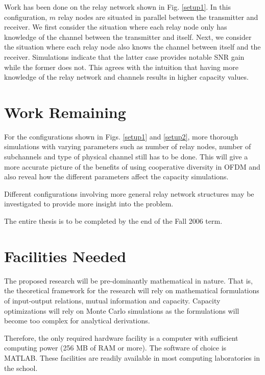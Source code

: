 \documentclass[12]{article}
\begin{document}
Work has been done on the relay network shown in Fig. \ref{setup1}.  In this configuration, $m$ relay nodes are situated in parallel between the transmitter and receiver.  We first consider the situation where each relay node only has knowledge of the channel between the transmitter and itself.  Next, we consider the situation where each relay node also knows the channel between itself and the receiver.  Simulations indicate that the latter case provides notable SNR gain while the former does not.  This agrees with the intuition that having more knowledge of the relay network and channels results in higher capacity values.
\section{Work Remaining}
For the configurations shown in Figs. \ref{setup1} and \ref{setup2}, more thorough simulations with varying parameters such as number of relay nodes, number of subchannels and type of physical channel still has to be done.  This will give a more accurate picture of the benefits of using cooperative diversity in OFDM and also reveal how the different parameters affect the capacity simulations.

Different configurations involving more general relay network structures may be investigated to provide more insight into the problem.

The entire thesis is to be completed by the end of the Fall 2006 term.
\section{Facilities Needed}
The proposed research will be pre-dominantly mathematical in nature.  That is, the theoretical framework for the research will rely on mathematical formulations of input-output relations, mutual information and capacity.  Capacity optimizations will rely on Monte Carlo simulations as the formulations will become too complex for analytical derivations.

Therefore, the only required hardware facility is a computer with sufficient computing power (256 MB of RAM or more).  The software of choice is MATLAB.  These facilities are readily available in most computing laboratories in the school.



\end{document}
